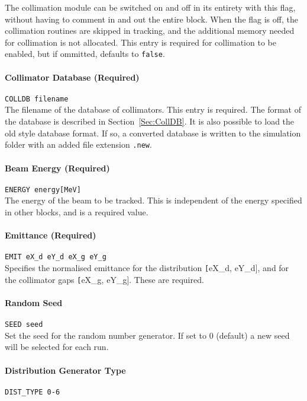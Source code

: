 The collimation module can be switched on and off in its entirety with this flag, without having to comment in and out the entire block.
When the flag is off, the collimation routines are skipped in tracking, and the additional memory needed for collimation is not allocated.
This entry is required for collimation to be enabled, but if ommitted, defaults to \texttt{false}.

\paragraph{Collimator Database (Required)} \texttt{COLLDB filename}\\

The filename of the database of collimators.
This entry is required.
The format of the database is described in Section~\ref{Sec:CollDB}.
It is also possible to load the old style database format.
If so, a converted database is written to the simulation folder with an added file extension \texttt{.new}.

\paragraph{Beam Energy (Required)} \texttt{ENERGY energy[MeV]}\\

The energy of the beam to be tracked.
This is independent of the energy specified in other blocks, and is a required value.

\paragraph{Emittance (Required)} \texttt{EMIT eX\_d eY\_d eX\_g eY\_g}\\

Specifies the normalised emittance for the distribution \texttt[eX\_d, eY\_d], and for the collimator gaps \texttt[eX\_g, eY\_g].
These are required.

\paragraph{Random Seed} \texttt{SEED seed}\\

Set the seed for the random number generator.
If set to 0 (default) a new seed will be selected for each run.

\paragraph{Distribution Generator Type} \texttt{DIST\_TYPE 0-6}\\

